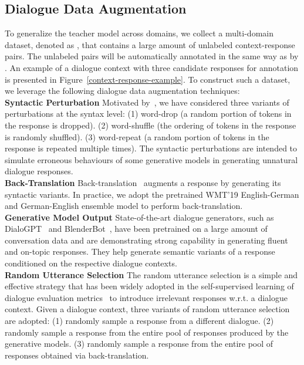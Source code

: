 \documentclass[letterpaper]{article} \usepackage{aaai22}  \usepackage{times}  \usepackage{helvet}  \usepackage{courier}  \usepackage[hyphens]{url}  \usepackage{graphicx} \urlstyle{rm} \def\UrlFont{\rm}  \usepackage{natbib}  \usepackage{caption} \DeclareCaptionStyle{ruled}{labelfont=normalfont,labelsep=colon,strut=off} \frenchspacing  \setlength{\pdfpagewidth}{8.5in}  \setlength{\pdfpageheight}{11in}  \usepackage{algorithm}
\begin{document}
\subsection{Dialogue Data Augmentation}
\label{subsec:dialog-augmentation}

To generalize the teacher model across domains, we collect a multi-domain dataset, denoted as , that contains a large amount of unlabeled context-response pairs. The unlabeled pairs will be automatically annotated in the same way as  by . An example of a dialogue context with three candidate responses for annotation is presented in Figure~\ref{context-response-example}. To construct such a dataset, we leverage the following dialogue data augmentation techniques:
\\

\noindent\textbf{Syntactic Perturbation}
Motivated by~\citep{sinha-etal-2020-learning}, we have considered three variants of perturbations at the syntax level: (1) word-drop (a random portion of tokens in the response is dropped). (2) word-shuffle (the ordering of tokens in the response is randomly shuffled). (3) word-repeat (a random portion of tokens in the response is repeated multiple times). The syntactic perturbations are intended to simulate erroneous behaviours of some generative models in generating unnatural dialogue responses.
\\

\noindent\textbf{Back-Translation}
Back-translation~\citep{edunov-etal-2018-understanding} augments a response by generating its syntactic variants. In practice, we adopt the pretrained WMT’19 English-German and German-English ensemble model to perform back-translation. 
\\  

\noindent\textbf{Generative Model Output}
State-of-the-art dialogue generators, such as DialoGPT~\citep{zhang-etal-2020-dialogpt} and BlenderBot~\citep{roller-etal-2021-recipes}, have been pretrained on a large amount of conversation data and are demonstrating strong capability in generating fluent and on-topic responses. They help generate semantic variants of a response conditioned on the respective dialogue contexts.  
\\

\noindent\textbf{Random Utterance Selection}
The random utterance selection is a simple and effective strategy that has been widely adopted in the self-supervised learning of dialogue evaluation metrics~\citep{mehri-eskenazi-2020-usr,huang-etal-2020-grade,sai-etal-2020-improving} to introduce irrelevant responses w.r.t. a dialogue context. Given a dialogue context, three variants of random utterance selection are adopted: (1) randomly sample a response from a different dialogue. (2) randomly sample a response from the entire pool of responses produced by the generative models. (3) randomly sample a response from the entire pool of responses obtained via back-translation.
\\
\end{document}
